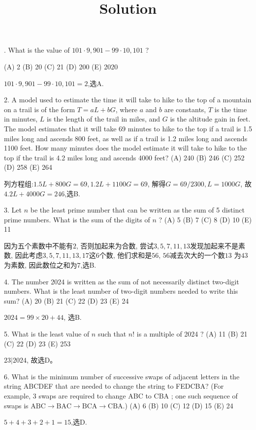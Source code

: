 \documentclass[12pt,a4paper]{article}
\title{Solution}
\date{}
\theoremstyle{definition}
\begin{document}
. What is the value of $101 \cdot 9,901-99 \cdot 10,101$ ?

(A) 2
(B) 20
(C) 21
(D) 200
(E) 2020

$101 \cdot 9,901-99 \cdot 10,101=2$,选A.

2. A model used to estimate the time it will take to hike to the top of a mountain on a trail is of the form $T=a L+b G$, where $a$ and $b$ are constants, $T$ is the time in minutes, $L$ is the length of the trail in miles, and $G$ is the altitude gain in feet. The model estimates that it will take 69 minutes to hike to the top if a trail is 1.5 miles long and ascends 800 feet, as well as if a trail is 1.2 miles long and ascends 1100 feet. How many minutes does the model estimate it will take to hike to the top if the trail is 4.2 miles long and ascends 4000 feet?
(A) 240
(B) 246
(C) 252
(D) 258
(E) 264

列方程组:$1.5L+800G=69, 1.2L+1100G=69$, 解得$G=69/2300, L=1000G$, 故$4.2L+4000G=246$,选B.

3. Let $n$ be the least prime number that can be written as the sum of 5 distinct prime numbers. What is the sum of the digits of $n$ ?
(A) 5
(B) 7
(C) 8
(D) 10
(E) 11

因为五个素数中不能有$2$, 否则加起来为合数, 尝试$3,5,7,11,13$发现加起来不是素数, 因此考虑$3,5,7,11,13,17$这6个数, 他们求和是$56$, $56$减去次大的一个数$13$
为$43$为素数, 因此数位之和为$7$,选B.

4. The number 2024 is written as the sum of not necessarily distinct two-digit numbers. What is the least number of two-digit numbers needed to write this sum?
(A) 20
(B) 21
(C) 22
(D) 23
(E) 24

$2024=99\times 20+44$, 选B. 

5. What is the least value of $n$ such that $n!$ is a multiple of 2024 ?
(A) 11
(B) 21
(C) 22
(D) 23
(E) 253

$23|2024$, 故选D。 

6. What is the minimum number of successive swaps of adjacent letters in the string ABCDEF that are needed to change the string to FEDCBA? (For example, 3 swaps are required to change ABC to CBA ; one such sequence of swaps is $\mathrm{ABC} \rightarrow \mathrm{BAC} \rightarrow \mathrm{BCA} \rightarrow \mathrm{CBA}$.)
(A) 6
(B) 10
(C) 12
(D) 15
(E) 24

$5+4+3+2+1=15$,选D.
\end{document}
